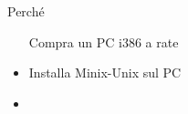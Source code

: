\documentclass{beamer}
\begin{document}
\begin{frame}
\begin{minipage}{.55\linewidth}
\begin{block}{Perché}
\begin{itemize}
                    \begin{minipage}{.75\linewidth} Compra un PC i386 a rate \end{minipage}
                    \pause
                \item
                    \begin{minipage}{.2\linewidth}  \end{minipage}
                    \begin{minipage}{.75\linewidth} Installa Minix-Unix sul PC \end{minipage}
                    \pause
                \item
                    \begin{minipage}{.2\linewidth}  \end{minipage}

\end{itemize}
\end{block}
\end{minipage}
\end{frame}
\end{document}
